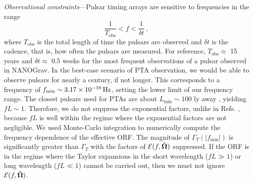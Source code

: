 \documentclass[prd,twocolumn,aps,psfig,nofootinbib,nobibnotes,superscriptaddress,preprintnumbers,times]{revtex4-2}
\newcommand{\Hz}{\,{\rm Hz}}
\begin{document}
\textit{Observational constraints}---Pulsar timing arrays are sensitive to frequencies in the range \cite{Moore:2014lga}
\begin{equation}\label{eq:freqrange}
    \frac{1}{T_{\text{obs}}} < f < \frac{1}{\delta t}\ ,
\end{equation} 
where $T_{\text{obs}}$ is the total length of time the pulsars are observed and $\delta t$ is the cadence, that is, how often the pulsars are measured. For reference, $T_{\text{obs}} \approx$ 15 years and $\delta t \approx$ 0.5 weeks for the most frequent observations of a pulsar observed in NANOGrav. 
In the best-case scenario of PTA observation, we would be able to observe pulsars for nearly a century, if not longer. This corresponds to a frequency of $f_{\text{min}} \sim 3.17 \times 10^{-10} \Hz$, setting the lower limit of our frequency range. The closest pulsars used for PTAs are about $L_{\text{min}} \sim 100$ ly away \cite{Anholm:2008wy}, yielding $fL \sim 1$. Therefore, we do not suppress the exponential factors, unlike in Refs. \cite{Liang:2021bct,Arjona:2024cex}, because $fL$ is well within the regime where the exponential factors are not negligible. %
We used Monte-Carlo integration to numerically compute the frequency dependence of the effective ORF. The magnitude of $\Gamma_T(|f_{\text{min}}|)$ is significantly greater than $\Gamma_T$ with the factors of $\mathcal{E}(f, \hat{\bf \Omega})$ suppressed. If the ORF is in the regime where the Taylor expansions in the short wavelength ($fL \gg 1$) or long wavelength ($fL \ll 1$) cannot be carried out, then we must not ignore $\mathcal{E}(f, \hat{\bf \Omega})$.
\end{document}
